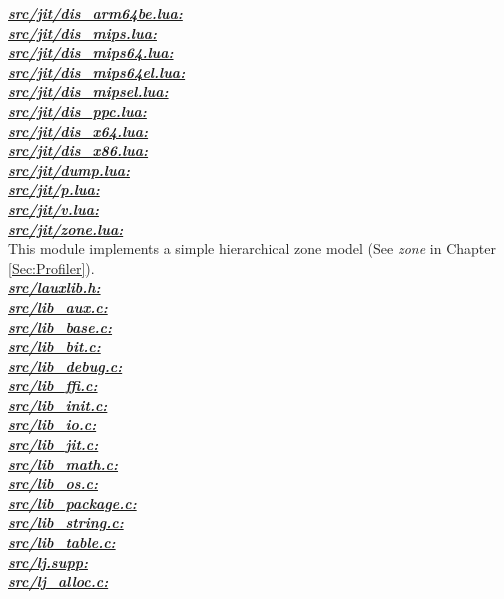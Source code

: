 \underline{\textbf{\emph{src/jit/dis\_arm64be.lua:}}}\\
\underline{\textbf{\emph{src/jit/dis\_mips.lua:}}}\\
\underline{\textbf{\emph{src/jit/dis\_mips64.lua:}}}\\
\underline{\textbf{\emph{src/jit/dis\_mips64el.lua:}}}\\
\underline{\textbf{\emph{src/jit/dis\_mipsel.lua:}}}\\
\underline{\textbf{\emph{src/jit/dis\_ppc.lua:}}}\\
\underline{\textbf{\emph{src/jit/dis\_x64.lua:}}}\\
\underline{\textbf{\emph{src/jit/dis\_x86.lua:}}}\\
\underline{\textbf{\emph{src/jit/dump.lua:}}}\\
\underline{\textbf{\emph{src/jit/p.lua:}}}\\
\underline{\textbf{\emph{src/jit/v.lua:}}}\\
\underline{\textbf{\emph{src/jit/zone.lua:}}}\\
This module implements a simple hierarchical zone model
(See \emph{zone} in Chapter \ref{Sec:Profiler}).\\
\underline{\textbf{\emph{src/lauxlib.h:}}}\\
\underline{\textbf{\emph{src/lib\_aux.c:}}}\\
\underline{\textbf{\emph{src/lib\_base.c:}}}\\
\underline{\textbf{\emph{src/lib\_bit.c:}}}\\
\underline{\textbf{\emph{src/lib\_debug.c:}}}\\
\underline{\textbf{\emph{src/lib\_ffi.c:}}}\\
\underline{\textbf{\emph{src/lib\_init.c:}}}\\
\underline{\textbf{\emph{src/lib\_io.c:}}}\\
\underline{\textbf{\emph{src/lib\_jit.c:}}}\\
\underline{\textbf{\emph{src/lib\_math.c:}}}\\
\underline{\textbf{\emph{src/lib\_os.c:}}}\\
\underline{\textbf{\emph{src/lib\_package.c:}}}\\
\underline{\textbf{\emph{src/lib\_string.c:}}}\\
\underline{\textbf{\emph{src/lib\_table.c:}}}\\
\underline{\textbf{\emph{src/lj.supp:}}}\\
\underline{\textbf{\emph{src/lj\_alloc.c:}}}\\
